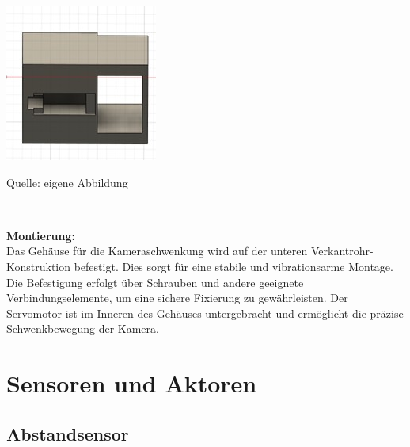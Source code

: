 \documentclass[ngerman,12pt,a4paper]{article}
\begin{document}
				\begin{center}
					\begin{minipage}[t]{0.2\textwidth}
						\includegraphics[scale=0.5]{Pictures/Aussparung_servo}
						\label{fig:camturn}
						\vspace{-10pt}
						\begin{center}
							\par\small Quelle: eigene Abbildung
						\end{center}
					\end{minipage} \\[0.70cm]
				\end{center}
				\textbf{Montierung:}\\[0.2cm]
				Das Gehäuse für die Kameraschwenkung wird auf der unteren Verkantrohr-Konstruktion befestigt. Dies sorgt für eine stabile und vibrationsarme Montage. Die Befestigung erfolgt über Schrauben und andere geeignete Verbindungselemente, um eine sichere Fixierung zu gewährleisten. Der Servomotor ist im Inneren des Gehäuses untergebracht und ermöglicht die präzise Schwenkbewegung der Kamera.
				
	\newpage
	\section{Sensoren und Aktoren}
	
		\subsection{Abstandsensor} %
\end{document}
